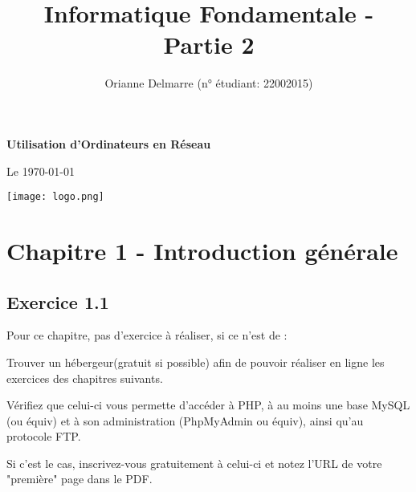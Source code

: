 \documentclass[11pt]{article}
\begin{document}
\title{Informatique Fondamentale - Partie 2} %

\newcommand{\name}{Orianne Delmarre} %
\newcommand{\studentid}{22002015} %
\newcommand{\subtitle}{Utilisation d’Ordinateurs en Réseau} %
\author{\name{} (n° étudiant: \studentid{})}

\begin{titlepage}

    \begin{center}
        \makeatletter
            {\large \bfseries \@author } \vspace{0.5cm} %

            \@title \vspace{0.2cm} %

            {\large \bfseries \subtitle{}} \vspace{0.5cm} 

            Le \today
            \vspace{0.5cm}

            \texttt{[image: logo.png]} 
        \makeatother
    \end{center}

\end{titlepage}

\tableofcontents

\newpage

\section*{Chapitre 1 - Introduction générale}

	\subsection*{Exercice 1.1}
	
	Pour ce chapitre, pas d’exercice à réaliser, si ce n’est de :

Trouver un hébergeur(gratuit si possible) afin de pouvoir réaliser en ligne les exercices des chapitres suivants.

Vérifiez que celui-ci vous permette d’accéder à PHP, à au moins une base MySQL (ou équiv) et à son administration (PhpMyAdmin
ou équiv), ainsi qu’au protocole FTP.

Si c’est le cas, inscrivez-vous gratuitement à celui-ci et notez l’URL de votre "première" page dans le PDF.
\end{document}
